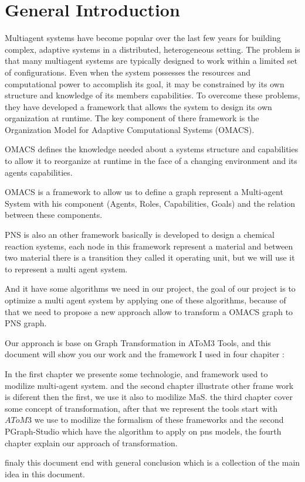 
\chapter*{General Introduction}





\textbf{}



Multiagent systems have become popular over the last few years for building complex, adaptive systems
in a distributed, heterogeneous setting. The problem is that many multiagent systems are typically designed to work within 
a limited set of configurations. Even when the system possesses the resources and
computational power to accomplish its goal, it may be constrained by its own structure and knowledge
of its members capabilities. To overcome these problems, they have developed a framework that allows
the system to design its own organization at runtime. The key component of there framework is the
Organization Model for Adaptive Computational Systems (OMACS)\cite{omacs4}.

OMACS defines the knowledge needed about a systems structure and capabilities to allow it to reorganize at runtime in the face of a changing environment and its agents capabilities\cite{omacs4}\cite{omacs2}.
 

OMACS  is  a framework to allow us  to define a graph represent a Multi-agent System with his component (Agents, Roles, Capabilities, Goals) and the relation between these components.
 
 	
PNS is also an other framework basically is developed to design a chemical reaction systems, each node in this framework represent a material and between two material there is a transition they called it operating unit, but we will use it  to represent a multi agent system. 


And it have some algorithms we need in our project, the goal of our project is to optimize a multi agent system by applying one of these algorithms, because of that we need to propose a new approach allow to transform a OMACS graph to PNS graph.


Our approach is base on Graph Transformation in AToM3 Tools, and this document will show you our work and the framework I used  in four chapiter : 

In the first chapter we presente some technologie, and framework used to  modilize multi-agent system. and the second chapter illustrate other frame work is diferent then the first, we use it also to modilize MaS.
the third chapter cover some concept of transformation, after that we represent the tools start with  $AToM3$ we use to modilize the formalism of these frameworks and the second PGraph-Studio which have the algorithm to apply on pns models, the fourth chapter  explain our approach of transformation.

finaly this document end with general conclusion which is a collection of the main idea in this document.

 



